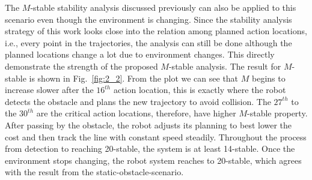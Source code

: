 \documentclass{ifacconf}
\begin{document}
The $M$-stable stability analysis discussed previously can also be applied to this scenario even though the environment is changing. Since the stability analysis strategy of this work looks close into the relation among planned action locations, i.e., every point in the trajectories, the analysis can still be done although the planned locations change a lot due to environment changes. This directly demonstrate the strength of the proposed $M$-stable analysis. The result for $M$-stable is shown in Fig.~\ref{fig:2_2}. From the plot we can see that $M$ begins to increase slower after the $16^{th}$ action location, this is exactly where the robot detects the obstacle and plans the new trajectory to avoid collision. The $27^{th}$ to the $30^{th}$ are the critical action locations, therefore, have higher $M$-stable property. After passing by the obstacle, the robot adjusts its planning to best lower the cost and then track the line with constant speed steadily. Throughout the process from detection to reaching 20-stable, the system is at least 14-stable. Once the environment stops changing, the robot system reaches to 20-stable, which agrees with the result from the static-obstacle-scenario.     
\end{document}
